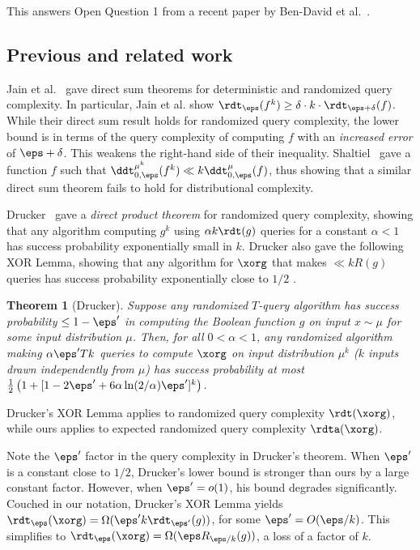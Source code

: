 \documentclass[11pt]{article}
\numberwithin{equation}{section}
\newtheorem{theorem}{Theorem}[section]
\theoremstyle{definition}
\theoremstyle{plain}
\begin{document}
This answers Open Question 1 from %
a recent paper by  %
Ben-David et al.~\cite{BenDavidGKW20}.

%
\subsection{Previous and related work}

Jain et al.~\cite{JainKS10} gave direct sum theorems for deterministic
and randomized query complexity.  %
%
%
%
%
In particular, Jain et al. show
$\rdt_\eps(f^k) \geq \delta \cdot k \cdot \rdt_{\eps + \delta}(f)$.
While their direct sum result holds for randomized query complexity,
the lower bound is in terms of the query complexity of computing $f$
with an \emph{increased error} of $\eps+\delta$.  This weakens the right-hand side of their inequality.
%
%
%
%
%
%
Shaltiel~\cite{Shaltiel03} gave a function $f$ such %
that $\ddt_{0,\eps}^{\mu^k}(f^k) \ll k\ddt_{0,\eps}^\mu(f)$, thus %
showing that a similar direct sum theorem fails to hold for %
distributional complexity. %

%
%
%
%
%
%
%
%
Drucker~\cite{Drucker12} gave a
\emph{direct product theorem} for randomized query complexity, showing
that any algorithm computing $g^k$ using $\alpha k\rdt(g)$ queries for
a constant $\alpha<1$ has success probability exponentially small in
$k$.  %
Drucker also gave the following XOR Lemma, showing that any
algorithm for $\xorg$ that makes $\ll kR(g)$ queries has
success probability exponentially close to $1/2$
%
%
%
\cite[Theorem 1.3]{Drucker12}.
%
\begin{theorem}[Drucker]
Suppose any
%
randomized %
$T$-query algorithm has success
probability  %
$\leq 1-\eps'$ in computing
%
the Boolean function %
$g$ on input $x \sim \mu$
for some input distribution $\mu$.
%
Then, for all $0<\alpha<1$, any randomized  
algorithm making $\alpha \eps' Tk$ queries to compute $\xorg$
on input distribution $\mu^k$   %
($k$ inputs drawn independently from $\mu$)  %
has success probability at most
  $\frac{1}{2}\left(1 + [1-2\eps' +
    6\alpha\ln(2/\alpha)\eps']^k\right)$.
\end{theorem}

Drucker's XOR Lemma applies to %
%
%
%
randomized  %
query complexity 
$\rdt(\xorg)$, while ours applies to %
expected %
randomized  %
query complexity $\rdta(\xorg)$.

Note the $\eps'$ factor in the query complexity in Drucker's theorem.
When $\eps'$ is a constant close to $1/2$, Drucker's lower bound is
stronger than ours by a large constant factor.  However, when $\eps' = o(1)$,
his bound degrades significantly.  Couched in our notation, Drucker's
XOR Lemma yields
$\rdt_\eps(\xorg) = \Omega(\eps'k \rdt_{\eps'}(g))$, for some
$\eps' = O(\eps/k)$.  This simplifies to
$\rdt_\eps(\xorg) = \Omega(\eps R_{\eps/k}(g))$, a loss of a
factor of $k$.
\end{document}

